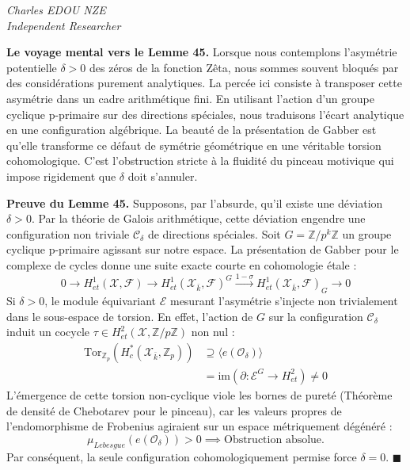 \documentclass[
]{article}
\begin{document}
\vspace{1cm}\begin{flushright}\textit{Charles EDOU NZE \\ \small Independent Researcher}\end{flushright}


\vspace{1em}
\noindent
\textbf{Le voyage mental vers le Lemme 45.}
Lorsque nous contemplons l'asymétrie potentielle $\delta > 0$ des zéros de la fonction Zêta, nous sommes souvent bloqués par des considérations purement analytiques. La percée ici consiste à transposer cette asymétrie dans un cadre arithmétique fini. En utilisant l'action d'un groupe cyclique p-primaire sur des directions spéciales, nous traduisons l'écart analytique en une configuration algébrique. La beauté de la présentation de Gabber est qu'elle transforme ce défaut de symétrie géométrique en une véritable torsion cohomologique. C'est l'obstruction stricte à la fluidité du pinceau motivique qui impose rigidement que $\delta$ doit s'annuler.

\vspace{0.5em}
\noindent
\textbf{Preuve du Lemme 45.}
Supposons, par l'absurde, qu'il existe une déviation $\delta > 0$. Par la théorie de Galois arithmétique, cette déviation engendre une configuration non triviale $\mathcal{C}_\delta$ de directions spéciales.
Soit $G = \mathbb{Z}/p^k\mathbb{Z}$ un groupe cyclique p-primaire agissant sur notre espace. La présentation de Gabber pour le complexe de cycles donne une suite exacte courte en cohomologie étale :
\begin{equation*}
0 \to H^1_{et}(\mathcal{X}, \mathcal{F}) \to H^1_{et}(\mathcal{X}_{\bar{k}}, \mathcal{F})^G \xrightarrow{1 - \sigma} H^1_{et}(\mathcal{X}_{\bar{k}}, \mathcal{F})_G \to 0
\end{equation*}
Si $\delta > 0$, le module équivariant $\mathcal{E}$ mesurant l'asymétrie s'injecte non trivialement dans le sous-espace de torsion. En effet, l'action de $G$ sur la configuration $\mathcal{C}_\delta$ induit un cocycle $\tau \in H^2_{et}(\mathcal{X}, \mathbb{Z}/p\mathbb{Z})$ non nul :
\begin{align*}
\text{Tor}_{\mathbb{Z}_p}(H^*_c(\mathcal{X}_{\bar{k}}, \mathbb{Z}_p)) &\supseteq \langle e(\mathcal{O}_\delta) \rangle \\
&= \text{im}\left( \partial : \mathcal{E}^G \to H^2_{et} \right) \neq 0
\end{align*}
L'émergence de cette torsion non-cyclique viole les bornes de pureté (Théorème de densité de Chebotarev pour le pinceau), car les valeurs propres de l'endomorphisme de Frobenius agiraient sur un espace métriquement dégénéré :
\begin{equation*}
\mu_{Lebesgue}(e(\mathcal{O}_\delta)) > 0 \implies \text{Obstruction absolue.}
\end{equation*}
Par conséquent, la seule configuration cohomologiquement permise force $\delta = 0$.
\hfill $\blacksquare$
\end{document}
